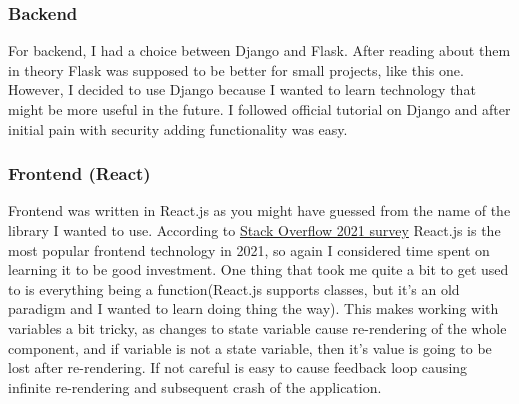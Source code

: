 \documentclass[14pt]{report}
\begin{document}
\subsubsection*{Backend}
For backend, I had a choice between Django and Flask. After reading about them in theory Flask was supposed to be better for small projects, like this one. However, I decided to use Django because I wanted to learn technology that might be more useful in the future. I followed official tutorial on Django and after initial pain with security adding functionality was easy.

\subsubsection*{Frontend (React)}
Frontend was written in React.js as you might have guessed from the name of the library I wanted to use. According to \href{https://insights.stackoverflow.com/survey/2021#most-popular-technologies-webframe}{Stack Overflow 2021 survey} React.js is the most popular frontend technology in 2021, so again I considered time spent on learning it to be good investment. One thing that took me quite a bit to get used to is everything being a function(React.js supports classes, but it's an old paradigm and I wanted to learn doing thing the  way). This makes working with variables a bit tricky, as changes to state variable cause re-rendering of the whole component, and if variable is not a state variable, then it's value is going to be lost after re-rendering. If not careful is easy to cause feedback loop causing infinite re-rendering and subsequent crash of the application. 
\end{document}
